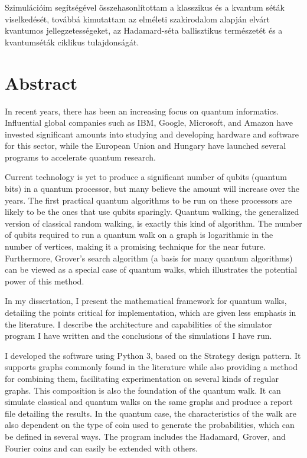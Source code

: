 Szimulációim segítségével összehasonlítottam a klasszikus és a kvantum séták viselkedését, továbbá kimutattam az elméleti szakirodalom alapján elvárt kvantumos jellegzetességeket, az Hadamard-séta ballisztikus természetét és a kvantumséták ciklikus tulajdonságát.


\vfill
\selectenglish


\chapter*{Abstract}

In recent years, there has been an increasing focus on quantum informatics. Influential global companies such as IBM, Google, Microsoft, and Amazon have invested significant amounts into studying and developing hardware and software for this sector, while the European Union and Hungary have launched several programs to accelerate quantum research.

Current technology is yet to produce a significant number of qubits (quantum bits) in a quantum processor, but many believe the amount will increase over the years. The first practical quantum algorithms to be run on these processors are likely to be the ones that use qubits sparingly. Quantum walking, the generalized version of classical random walking, is exactly this kind of algorithm. The number of qubits required to run a quantum walk on a graph is logarithmic in the number of vertices, making it a promising technique for the near future. Furthermore, Grover's search algorithm (a basis for many quantum algorithms) can be viewed as a special case of quantum walks, which illustrates the potential power of this method.

In my dissertation, I present the mathematical framework for quantum walks, detailing the points critical for implementation, which are given less emphasis in the literature. I describe the architecture and capabilities of the simulator program I have written and the conclusions of the simulations I have run.

I developed the software using Python 3, based on the Strategy design pattern. It supports graphs commonly found in the literature while also providing a method for combining them, facilitating experimentation on several kinds of regular graphs. This composition is also the foundation of the quantum walk. It can simulate classical and quantum walks on the same graphs and produce a report file detailing the results. In the quantum case, the characteristics of the walk are also dependent on the type of coin used to generate the probabilities, which can be defined in several ways. The program includes the Hadamard, Grover, and Fourier coins and can easily be extended with others.

